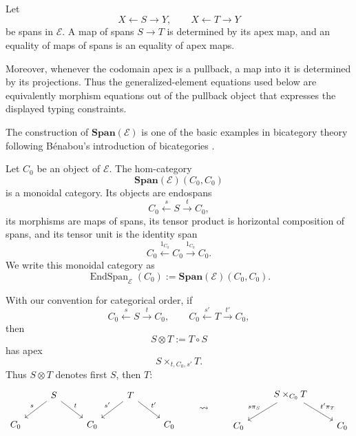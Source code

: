 \begin{lemma}
\label{lem:component-calculus-span-maps}
    Let
    \[
        X\xleftarrow{}S\xrightarrow{}Y,
        \qquad
        X\xleftarrow{}T\xrightarrow{}Y
    \]
    be spans in \(\mathcal E\). A map of spans \(S\to T\) is determined by its apex map, and an equality of maps of spans is an equality of apex maps.

    Moreover, whenever the codomain apex is a pullback, a map into it is determined by its projections. Thus the generalized-element equations used below are equivalently morphism equations out of the pullback object that expresses the displayed typing constraints.
\end{lemma}

\begin{remark}
\label{rem:span-bicategory-literature}
    The construction of \(\mathbf{Span}(\mathcal E)\) is one of the basic examples in bicategory theory following B\'enabou's introduction of bicategories \cite{BenabouBicategories}.
\end{remark}

Let \(C_0\) be an object of \(\mathcal E\). The hom-category
\[
    \mathbf{Span}(\mathcal E)(C_0,C_0)
\]
is a monoidal category. Its objects are endospans
\[
    C_0\xleftarrow{s}S\xrightarrow{t}C_0,
\]
its morphisms are maps of spans, its tensor product is horizontal composition of spans, and its tensor unit is the identity span
\[
    C_0\xleftarrow{1_{C_0}}C_0\xrightarrow{1_{C_0}}C_0.
\]
We write this monoidal category as
\[
    \operatorname{EndSpan}_{\mathcal E}(C_0)
    :=
    \mathbf{Span}(\mathcal E)(C_0,C_0).
\]

With our convention for categorical order, if
\[
    C_0\xleftarrow{s}S\xrightarrow{t}C_0,
    \qquad
    C_0\xleftarrow{s'}T\xrightarrow{t'}C_0,
\]
then
\[
    S\otimes T:=T\circ S
\]
has apex
\[
    S\times_{t,C_0,s'}T.
\]
Thus \(S\otimes T\) denotes first \(S\), then \(T\):
\[
    \begin{tikzcd}
        & S \arrow[dl, "s"'] \arrow[dr, "t"] & & T \arrow[dl, "s'"'] \arrow[dr, "t'"] & \\
        C_0 & & C_0 & & C_0
    \end{tikzcd}
    \qquad\leadsto\qquad
    \begin{tikzcd}
        & S\times_{C_0}T \arrow[dl, "s\pi_S"']
                \arrow[dr, "t'\pi_T"] & \\
        C_0 && C_0
    \end{tikzcd}
\]

